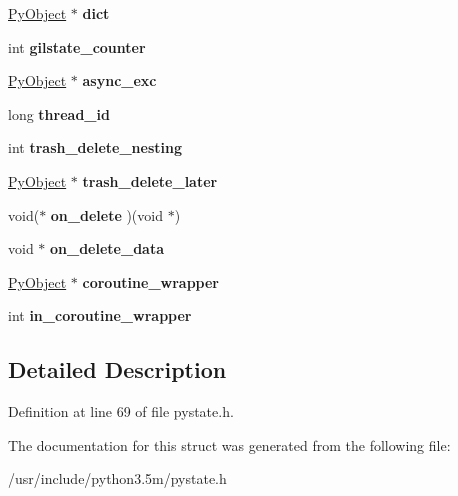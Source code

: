 \begin{DoxyCompactItemize}
\item 
\hyperlink{struct__object}{Py\+Object} $\ast$ {\bfseries dict}\hypertarget{struct__ts_acd979c9d066dde17e31d442cf653e9d5}{}\label{struct__ts_acd979c9d066dde17e31d442cf653e9d5}

\item 
int {\bfseries gilstate\+\_\+counter}\hypertarget{struct__ts_a2a1af12986d8ab605b22d0840f2c23cf}{}\label{struct__ts_a2a1af12986d8ab605b22d0840f2c23cf}

\item 
\hyperlink{struct__object}{Py\+Object} $\ast$ {\bfseries async\+\_\+exc}\hypertarget{struct__ts_a5049998e3860dc12b7104a382cf404c0}{}\label{struct__ts_a5049998e3860dc12b7104a382cf404c0}

\item 
long {\bfseries thread\+\_\+id}\hypertarget{struct__ts_a8232b11c626b661c1d69560e0b562e7d}{}\label{struct__ts_a8232b11c626b661c1d69560e0b562e7d}

\item 
int {\bfseries trash\+\_\+delete\+\_\+nesting}\hypertarget{struct__ts_ae8f5168097f7db47480b7c8e28832fc8}{}\label{struct__ts_ae8f5168097f7db47480b7c8e28832fc8}

\item 
\hyperlink{struct__object}{Py\+Object} $\ast$ {\bfseries trash\+\_\+delete\+\_\+later}\hypertarget{struct__ts_a90079dbf02b1666ef4b6b1017ad9dab7}{}\label{struct__ts_a90079dbf02b1666ef4b6b1017ad9dab7}

\item 
void($\ast$ {\bfseries on\+\_\+delete} )(void $\ast$)\hypertarget{struct__ts_a5636d1d3d3f66a2629c832eedc4e961a}{}\label{struct__ts_a5636d1d3d3f66a2629c832eedc4e961a}

\item 
void $\ast$ {\bfseries on\+\_\+delete\+\_\+data}\hypertarget{struct__ts_ad884a618beea03ff4826eab09b252c3b}{}\label{struct__ts_ad884a618beea03ff4826eab09b252c3b}

\item 
\hyperlink{struct__object}{Py\+Object} $\ast$ {\bfseries coroutine\+\_\+wrapper}\hypertarget{struct__ts_a120ec7760cf23f6db30830675584778d}{}\label{struct__ts_a120ec7760cf23f6db30830675584778d}

\item 
int {\bfseries in\+\_\+coroutine\+\_\+wrapper}\hypertarget{struct__ts_ad95eb898bfbaf97f54774dfd48e0ada5}{}\label{struct__ts_ad95eb898bfbaf97f54774dfd48e0ada5}

\end{DoxyCompactItemize}


\subsection{Detailed Description}


Definition at line 69 of file pystate.\+h.



The documentation for this struct was generated from the following file\+:\begin{DoxyCompactItemize}
\item 
/usr/include/python3.\+5m/pystate.\+h\end{DoxyCompactItemize}
